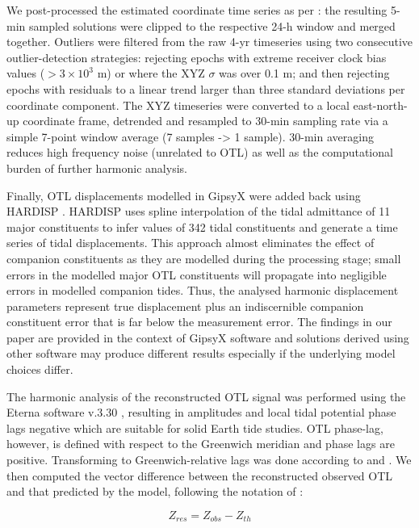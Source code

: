 \documentclass[se, manuscript]{copernicus}
\begin{document}
We post-processed the estimated coordinate time series as per \cite{Penna2015}: the resulting 5-min sampled solutions were clipped to the respective 24-h window and merged together. Outliers were filtered from the raw 4-yr timeseries  using two consecutive outlier-detection strategies: rejecting epochs with extreme receiver clock bias values ($>3 \times 10^{3}$ m) or where the XYZ $\sigma$ was over 0.1 m; and then rejecting epochs with residuals to a linear trend larger than three standard deviations per coordinate component. The XYZ timeseries were converted to a local east-north-up coordinate frame, detrended and resampled to 30-min sampling rate via a simple 7-point window average (7 samples -> 1 sample). 30-min averaging reduces high frequency noise (unrelated to OTL) as well as the computational burden of further harmonic analysis.

Finally, OTL displacements modelled in GipsyX were added back using HARDISP \citep{IERS2010}. HARDISP uses spline interpolation of the tidal admittance of 11 major constituents to infer values of 342 tidal constituents and generate a time series of tidal displacements. This approach almost eliminates the effect of companion constituents \citep{Foreman1989} as they are modelled during the processing stage; small errors in the modelled major OTL constituents will propagate into negligible errors in modelled companion tides. Thus, the analysed harmonic displacement parameters represent true displacement plus an indiscernible companion constituent error that is far below the measurement error. The findings in our paper are provided in the context of GipsyX software and solutions derived using other software may produce different results especially if the underlying model choices differ.

The harmonic analysis of the reconstructed OTL signal was performed using the Eterna software v.3.30 \citep{Wenzel1996}, resulting in amplitudes and local tidal potential phase lags negative which are suitable for solid Earth tide studies. OTL phase-lag, however, is defined with respect to the Greenwich meridian and phase lags are positive. Transforming to Greenwich-relative lags was done according to \cite{Boy2003} and \cite{Bos2000}. We then computed the vector difference between the reconstructed observed OTL and that predicted by the model, following the notation of \cite{Yuan2013}:

\begin{equation}
Z_{res} = Z_{obs}- Z_{th}
\end{equation}
\end{document}
